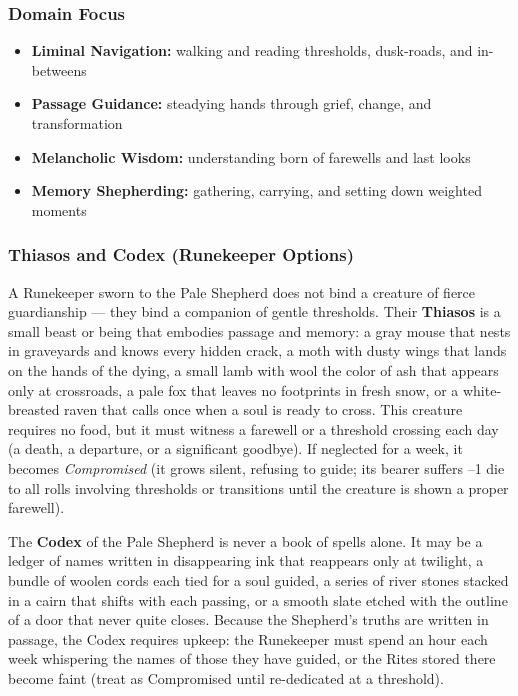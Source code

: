 \subsubsection*{Domain Focus}
\begin{itemize}
  \item \textbf{Liminal Navigation:} walking and reading thresholds, dusk-roads, and in-betweens
  \item \textbf{Passage Guidance:} steadying hands through grief, change, and transformation
  \item \textbf{Melancholic Wisdom:} understanding born of farewells and last looks
  \item \textbf{Memory Shepherding:} gathering, carrying, and setting down weighted moments
\end{itemize}

\subsubsection*{Thiasos and Codex (Runekeeper Options)}

A Runekeeper sworn to the Pale Shepherd does not bind a creature of fierce guardianship --- they bind a companion of gentle thresholds. Their \textbf{Thiasos} is a small beast or being that embodies passage and memory: a gray mouse that nests in graveyards and knows every hidden crack, a moth with dusty wings that lands on the hands of the dying, a small lamb with wool the color of ash that appears only at crossroads, a pale fox that leaves no footprints in fresh snow, or a white-breasted raven that calls once when a soul is ready to cross. This creature requires no food, but it must witness a farewell or a threshold crossing each day (a death, a departure, or a significant goodbye). If neglected for a week, it becomes \textit{Compromised} (it grows silent, refusing to guide; its bearer suffers --1 die to all rolls involving thresholds or transitions until the creature is shown a proper farewell).

The \textbf{Codex} of the Pale Shepherd is never a book of spells alone. It may be a ledger of names written in disappearing ink that reappears only at twilight, a bundle of woolen cords each tied for a soul guided, a series of river stones stacked in a cairn that shifts with each passing, or a smooth slate etched with the outline of a door that never quite closes. Because the Shepherd's truths are written in passage, the Codex requires upkeep: the Runekeeper must spend an hour each week whispering the names of those they have guided, or the Rites stored there become faint (treat as Compromised until re-dedicated at a threshold).

